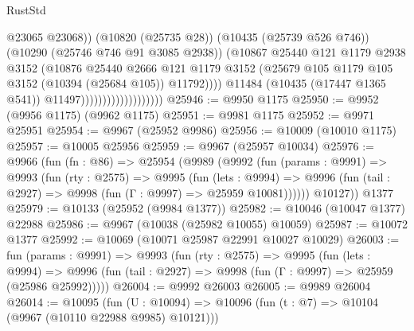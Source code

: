 \begin{lexlean}{RustStd}
\begin{coremodule}
                                                @23065
                                                @23068))
                                            (@10820 (@25735 @28))
                                            (@10435 (@25739 @526 @746))
                                            (@10290 (@25746 @746 @91 @3085 @2938))
                                            (@10867
                                              @25440
                                              @121
                                              @1179
                                              @2938
                                              @3152
                                              (@10876
                                                @25440
                                                @2666
                                                @121
                                                @1179
                                                @3152
                                                (@25679
                                                  @105
                                                  @1179
                                                  @105
                                                  @3152
                                                  (@10394 (@25684 @105))
                                                  @11792))))
                                          @11484
                                          (@10435 (@17447 @1365 @541))
                                          @11497)))))))))))))))))))
@25946 := @9950 @1175
@25950 := @9952 (@9956 @1175) (@9962 @1175)
@25951 := @9981 @1175
@25952 := @9971 @25951
@25954 := @9967 (@25952 @9986)
@25956 := @10009 (@10010 @1175)
@25957 := @10005 @25956
@25959 := @9967 (@25957 @10034)
@25976 := @9966
    (fun (fn : @86) =>
    @25954
      (@9989
        (@9992
          (fun (params : @9991) =>
          @9993
            (fun (rty : @2575) =>
            @9995
              (fun (lets : @9994) =>
              @9996 (fun (tail : @2927) => @9998 (fun (Γ : @9997) => @25959 @10081))))))
        @10127))
    @1377
@25979 := @10133 (@25952 (@9984 @1377))
@25982 := @10046 (@10047 @1377) @22988
@25986 := @9967 (@10038 (@25982 @10055) @10059)
@25987 := @10072 @1377
@25992 := @10069 (@10071 @25987 @22991 @10027 @10029)
@26003 := fun (params : @9991) =>
  @9993
    (fun (rty : @2575) =>
    @9995
      (fun (lets : @9994) =>
      @9996 (fun (tail : @2927) => @9998 (fun (Γ : @9997) => @25959 (@25986 @25992)))))
@26004 := @9992 @26003
@26005 := @9989 @26004
@26014 := @10095
    (fun (U : @10094) => @10096 (fun (t : @7) => @10104 (@9967 (@10110 @22988 @9985) @10121)))

\end{coremodule}
\end{lexlean}
